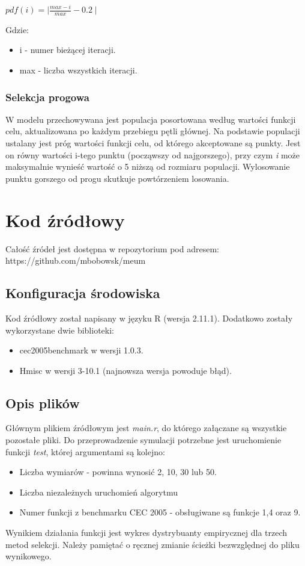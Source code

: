 \documentclass[11pt]{article}
\begin{document}
\vspace{5pt}
\begin{math}
 pdf(i) = \mid \frac{max - i}{max} - 0.2 \mid
\end{math}
\vspace{5pt}

Gdzie:
\begin{itemize}
 \item i - numer bieżącej iteracji.
 \item max - liczba wszystkich iteracji.
\end{itemize}


\subsubsection{Selekcja progowa}
W modelu przechowywana jest populacja posortowana według wartości funkcji celu, aktualizowana po każdym przebiegu pętli głównej.
Na podstawie populacji ustalany jest próg wartości funkcji celu, od którego akceptowane są punkty.
Jest on równy wartości i-tego punktu (począwszy od najgorszego), przy czym \emph{i} może maksymalnie wynieść wartość o 5 niższą od rozmiaru populacji.
Wylosowanie punktu gorszego od progu skutkuje powtórzeniem losowania.

\section{Kod źródłowy}
Całość źródeł jest dostępna w repozytorium pod adresem: https://github.com/mbobowsk/meum
\subsection{Konfiguracja środowiska}
Kod źródłowy został napisany w języku R (wersja 2.11.1).
Dodatkowo zostały wykorzystane dwie biblioteki:
\begin{itemize}
 \item cec2005benchmark w wersji 1.0.3.
 \item Hmisc w wersji 3-10.1 (najnowsza wersja powoduje błąd).
\end{itemize}

\subsection{Opis plików}
Głównym plikiem źródłowym jest \emph{main.r}, do którego załączane są wszystkie pozostałe pliki.
Do przeprowadzenie symulacji potrzebne jest uruchomienie funkcji \emph{test}, której argumentami są kolejno:
\begin{itemize}
 \item Liczba wymiarów - powinna wynosić 2, 10, 30 lub 50.
 \item Liczba niezależnych uruchomień algorytmu
 \item Numer funkcji z benchmarku CEC 2005 - obsługiwane są funkcje 1,4 oraz 9.
\end{itemize}
Wynikiem działania funkcji jest wykres dystrybuanty empirycznej dla trzech metod selekcji.
Należy pamiętać o ręcznej zmianie ścieżki bezwzględnej do pliku wynikowego.
\end{document}
